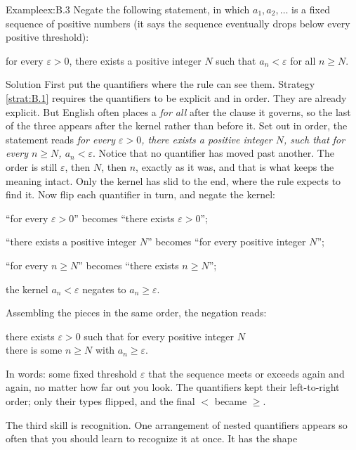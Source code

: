 \documentclass[a4paper,12pt,oneside]{memoir}
\begin{document}
\begin{workedexample}
\begin{envexample}{Example}{ex:B.3}{}
Negate the following statement, in which \(a_1, a_2, \ldots\) is a fixed sequence of positive numbers (it says the sequence eventually drops below every positive threshold):

\begin{centerstatement}
for every \(\varepsilon > 0\), there exists a positive integer \(N\) such that \(a_n < \varepsilon\) for all \(n \ge N\).
\end{centerstatement}
\end{envexample}
\begin{envsolution}{Solution}{}{}
First put the quantifiers where the rule can see them. Strategy \ref{strat:B.1} requires the quantifiers to be explicit and in order. They are already explicit. But English often places a \emph{for all} after the clause it governs, so the last of the three appears after the kernel rather than before it. Set out in order, the statement reads \emph{for every \(\varepsilon > 0\), there exists a positive integer \(N\), such that for every \(n \ge N\), \(a_n < \varepsilon\)}. Notice that no quantifier has moved past another. The order is still \(\varepsilon\), then \(N\), then \(n\), exactly as it was, and that is what keeps the meaning intact. Only the kernel has slid to the end, where the rule expects to find it. Now flip each quantifier in turn, and negate the kernel:

\begin{sollist}
  \item “for every \(\varepsilon > 0\)” becomes “there exists \(\varepsilon > 0\)”;
  \item “there exists a positive integer \(N\)” becomes “for every positive integer \(N\)”;
  \item “for every \(n \ge N\)” becomes “there exists \(n \ge N\)”;
  \item the kernel \(a_n < \varepsilon\) negates to \(a_n \ge \varepsilon\).
\end{sollist}
Assembling the pieces in the same order, the negation reads:

\begin{statementblock}
there exists \(\varepsilon > 0\) such that for every positive integer \(N\)\\
there is some \(n \ge N\) with \(a_n \ge \varepsilon\).
\end{statementblock}
In words: some fixed threshold \(\varepsilon\) that the sequence meets or exceeds again and again, no matter how far out you look. The quantifiers kept their left-to-right order; only their types flipped, and the final \(<\) became \(\ge\).
\end{envsolution}
\end{workedexample}
The third skill is recognition. One arrangement of nested quantifiers appears so often that you should learn to recognize it at once. It has the shape
\end{document}
